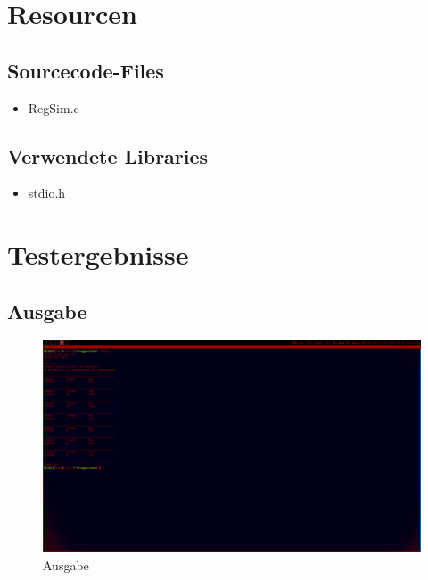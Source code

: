 \documentclass{scrartcl}
\begin{document}
\section{Resourcen}

\subsection{Sourcecode-Files}
\begin{itemize}
\item RegSim.c
  \end{itemize}
\subsection{Verwendete Libraries}
\begin{itemize}
\item stdio.h
\end{itemize}
\section{Testergebnisse}
\subsection{Ausgabe}
\begin{figure}[H]
  \centering
  \includegraphics[width=\linewidth]{images/ausgabe.png}
  \caption{Ausgabe}
  \label{fig:digraph}
\end{figure} 
\end{document}
